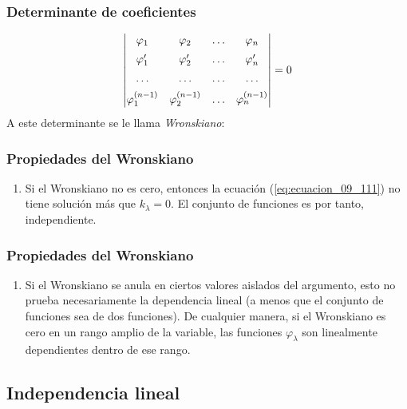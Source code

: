 \documentclass[12pt]{beamer}
\begin{document}
\begin{frame}
\frametitle{Determinante de coeficientes}
\begin{align*}
\mdet{
\varphi_{1} & \varphi_{2} & \ldots & \varphi_{n} \\[0.5em]
\pderivada{\varphi}_{1} & \pderivada{\varphi}_{2} & \ldots & \pderivada{\varphi}_{n} \\[0.5em]
\ldots & \ldots & \ldots & \ldots \\[0.5em]
\varphi^{(n-1)}_{1} & \varphi^{(n-1)}_{2} & \ldots & \varphi^{(n-1)}_{n} \\
} = 0
\end{align*}
A este determinante se le llama \emph{Wronskiano}:
\end{frame}
\begin{frame}
\frametitle{Propiedades del Wronskiano}
\fontsize{12}{12}\selectfont
\begin{enumerate}[<+->]
\item Si el Wronskiano no es cero, entonces la ecuación (\ref{eq:ecuacion_09_111}) no tiene solución más que $k_{\lambda} = 0$. El conjunto de funciones es por tanto, independiente.
\seti
\end{enumerate}
\end{frame}
\begin{frame}
\frametitle{Propiedades del Wronskiano}
\fontsize{12}{12}\selectfont
\begin{enumerate}[<+->]
\conti
\item Si el Wronskiano se anula en ciertos valores aislados del argumento, esto no prueba necesariamente la dependencia lineal (a menos que el conjunto de funciones sea de dos funciones). De cualquier manera, si el Wronskiano es cero en un rango amplio de la variable, las funciones $\varphi_{\lambda}$ son linealmente dependientes dentro de ese rango.
\end{enumerate}
\end{frame}

\subsection{Independencia lineal}
\end{document}
